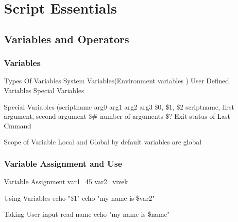 \documentclass{beamer}
\begin{document}
\section{ Script Essentials}
\subsection{ Variables and Operators }
\begin{frame}\frametitle{ Variables }

\begin{block}{ Types Of Variables }
System Variables(Environment variables ) \newline
User Defined Variables \newline
Special Variables
\end{block}
\pause
\begin{block}{ Special Variables (scriptname arg0 arg1 arg2 arg3}
\$0, \$1, \$2 scriptname, first argument, second argument \newline
\$\# number of arguments \newline
\$?  Exit status of Last Cmmand
\end{block}
\pause
\begin{block}{ Scope of Variable }
Local and Global \newline
by default variables are global
\end{block}

\end{frame}
\begin{frame}\frametitle{ Variable Assignment and Use }

\begin{block}{ Variable Assignment }
var1=45 \newline
var2=vivek
\end{block}
\pause
\begin{block}{ Using Variables }
echo "\$1" \newline
echo "my name is \$var2"
\end{block}
\pause
\begin{block}{ Taking User input }
read name \newline
echo "my name is \$name"
\end{block}
 
\end{frame}
\end{document}
